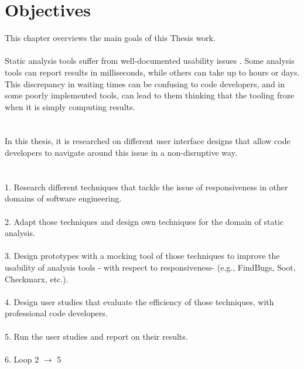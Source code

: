 \chapter{Objectives}
\label{ch:objectives}

This chapter overviews the main goals of this Thesis work. \\ \\

Static analysis tools suffer from well-documented usability issues \cite{CB16,JSMB13}. Some analysis tools can report results in milliseconds, while others can take up to hours or
days. This discrepancy in waiting times can be confusing to code developers, and in some poorly implemented
tools, can lead to them thinking that the tooling froze when it is simply computing results. \\ \\ \\
In this thesis, it is researched on different user interface designs that allow code developers to navigate around
this issue in a non-disruptive way. \\ \\ \\
1. Research different techniques that tackle the issue of responsiveness in other domains of software
engineering. \\ \\
2. Adapt those techniques and design own techniques for the domain of static analysis. \\ \\
3. Design prototypes with a mocking tool \cite{B} of those techniques to improve the usability of analysis tools -
with respect to responsiveness- (e.g., FindBugs, Soot, Checkmarx, etc.). \\ \\
4. Design user studies that evaluate the efficiency of those techniques, with professional code developers. \\ \\
5. Run the user studies and report on their results. \\ \\
6. Loop 2 $\rightarrow$ 5 

\let\cleardoublepage\clearpage